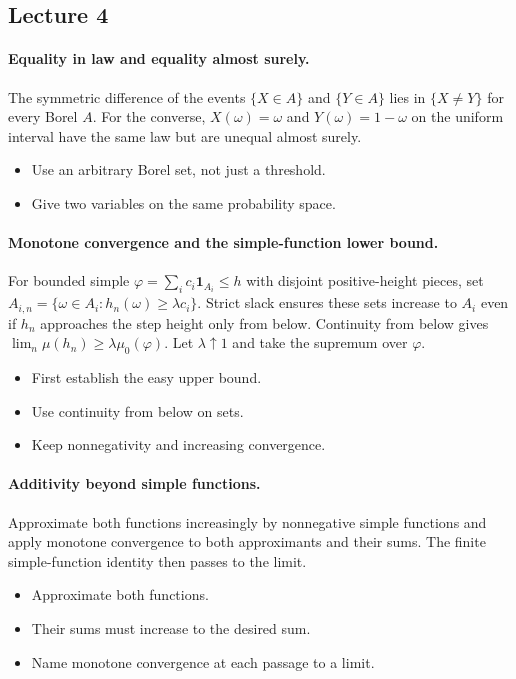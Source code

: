 \documentclass[11pt,letterpaper]{article}
\begin{document}
\subsection{Lecture 4}
\hypertarget{answer-l4-s2}{}\paragraph{Equality in law and equality almost surely.}
The symmetric difference of the events $\{X\in A\}$ and $\{Y\in A\}$ lies in $\{X\ne Y\}$ for every Borel $A$. For the converse, $X(\omega)=\omega$ and $Y(\omega)=1-\omega$ on the uniform interval have the same law but are unequal almost surely.
\begin{itemize}
\item Use an arbitrary Borel set, not just a threshold.
\item Give two variables on the same probability space.
\end{itemize}
\hypertarget{answer-l4-s8}{}\paragraph{Monotone convergence and the simple-function lower bound.}
For bounded simple $\varphi=\sum_i c_i\mathbf1_{A_i}\le h$ with disjoint positive-height pieces, set $A_{i,n}=\{\omega\in A_i:h_n(\omega)\ge\lambda c_i\}$. Strict slack ensures these sets increase to $A_i$ even if $h_n$ approaches the step height only from below. Continuity from below gives $\lim_n\mu(h_n)\ge\lambda\mu_0(\varphi)$. Let $\lambda\uparrow1$ and take the supremum over $\varphi$.
\begin{itemize}
\item First establish the easy upper bound.
\item Use continuity from below on sets.
\item Keep nonnegativity and increasing convergence.
\end{itemize}
\hypertarget{answer-l4-s9}{}\paragraph{Additivity beyond simple functions.}
Approximate both functions increasingly by nonnegative simple functions and apply monotone convergence to both approximants and their sums. The finite simple-function identity then passes to the limit.
\begin{itemize}
\item Approximate both functions.
\item Their sums must increase to the desired sum.
\item Name monotone convergence at each passage to a limit.
\end{itemize}
\end{document}

